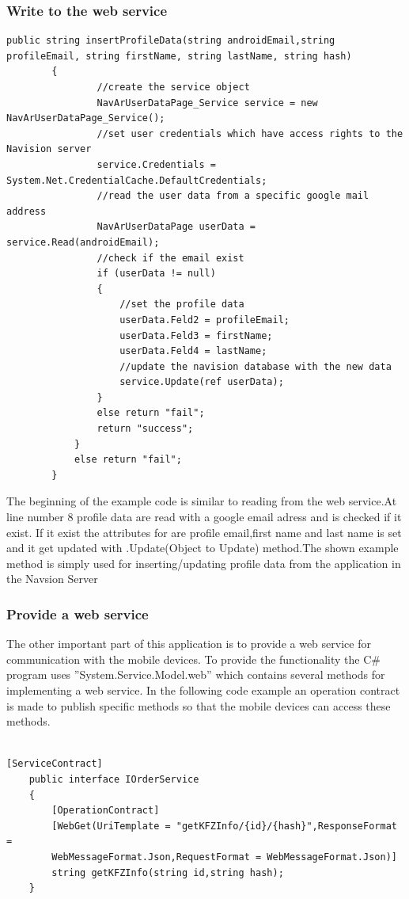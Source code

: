 \subsubsection{Write to the web service}
\begin{lstlisting}[caption=Example writing to web service]
 public string insertProfileData(string androidEmail,string profileEmail, string firstName, string lastName, string hash)
        {
                //create the service object
                NavArUserDataPage_Service service = new NavArUserDataPage_Service();
                //set user credentials which have access rights to the Navision server
                service.Credentials = System.Net.CredentialCache.DefaultCredentials;
                //read the user data from a specific google mail address
                NavArUserDataPage userData = service.Read(androidEmail);
                //check if the email exist
                if (userData != null)
                {
                    //set the profile data
                    userData.Feld2 = profileEmail;
                    userData.Feld3 = firstName;
                    userData.Feld4 = lastName;
                    //update the navision database with the new data
                    service.Update(ref userData);
                }
                else return "fail";
                return "success";
            }
            else return "fail";
        }
\end{lstlisting}
The beginning of the example code is similar to reading from the web service.At line number 8 profile data are read with a google email adress and is checked if it exist. If it exist the attributes for are profile email,first name and last name is set and it get updated with .Update(Object to Update) method.The shown example method is simply used for inserting/updating profile data from the application in the Navsion Server 
  
\newpage
\subsubsection{Provide a web service}

The other important part of this application is to provide a web service for communication with the mobile devices.  To provide the functionality the C\# program uses ''System.Service.Model.web'' which contains several methods for implementing a web service.  In the following code example an operation contract is made to publish specific methods so that the mobile devices can access these methods.
\\\\
\begin{lstlisting}
[ServiceContract]
    public interface IOrderService
    {
        [OperationContract]
        [WebGet(UriTemplate = "getKFZInfo/{id}/{hash}",ResponseFormat =           
        WebMessageFormat.Json,RequestFormat = WebMessageFormat.Json)]
        string getKFZInfo(string id,string hash);
    }
\end{lstlisting}


